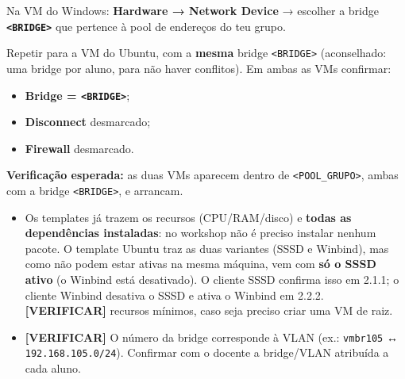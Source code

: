 Na VM do Windows: \textbf{Hardware → Network Device} → escolher a bridge \textbf{\texttt{\textless{}BRIDGE\textgreater{}}} que pertence à pool de endereços do teu grupo.


Repetir para a VM do Ubuntu, com a \textbf{mesma} bridge \texttt{\textless{}BRIDGE\textgreater{}} (aconselhado: uma bridge por aluno, para não haver conflitos). Em ambas as VMs confirmar:

\begin{itemize}
\item \textbf{Bridge = \texttt{\textless{}BRIDGE\textgreater{}}};
\item \textbf{Disconnect} desmarcado;
\item \textbf{Firewall} desmarcado.
\end{itemize}


\textbf{Verificação esperada:} as duas VMs aparecem dentro de \texttt{\textless{}POOL\_GRUPO\textgreater{}}, ambas com a bridge \texttt{\textless{}BRIDGE\textgreater{}}, e arrancam.

\begin{notabox}[title={Nota}]
\begin{itemize}
\item Os templates já trazem os recursos (CPU/RAM/disco) e \textbf{todas as dependências instaladas}: no workshop não é preciso instalar nenhum pacote. O template Ubuntu traz as duas variantes (SSSD e Winbind), mas como não podem estar ativas na mesma máquina, vem com \textbf{só o SSSD ativo} (o Winbind está desativado). O cliente SSSD confirma isso em 2.1.1; o cliente Winbind desativa o SSSD e ativa o Winbind em 2.2.2. \textbf{[VERIFICAR]} recursos mínimos, caso seja preciso criar uma VM de raiz.
\item \textbf{[VERIFICAR]} O número da bridge corresponde à VLAN (ex.: \texttt{vmbr105} ↔ \texttt{192.168.105.0/\allowbreak{}24}). Confirmar com o docente a bridge/VLAN atribuída a cada aluno.
\end{itemize}
\end{notabox}

